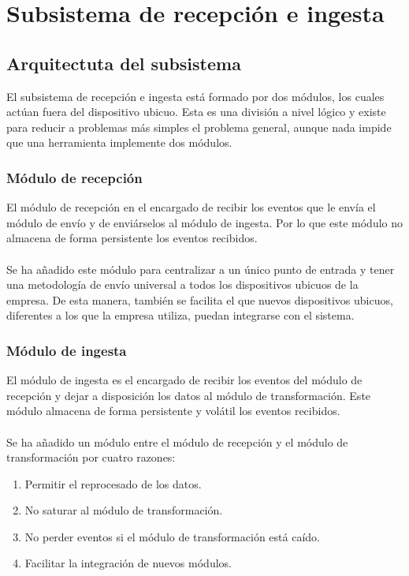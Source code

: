 \chapter{Subsistema de recepción e ingesta}

\section{Arquitectuta del subsistema}

El subsistema de recepción e ingesta está formado por dos módulos, los cuales actúan fuera del dispositivo ubicuo. Esta es una división a nivel lógico y existe para reducir a problemas más simples el problema general, aunque nada impide que una herramienta implemente dos módulos.

\subsection{Módulo de recepción}

El módulo de recepción en el encargado de recibir los eventos que le envía el módulo de envío y de enviárselos al módulo de ingesta. Por lo que este módulo no almacena de forma persistente los eventos recibidos.
\\\\
Se ha añadido este módulo para centralizar a un único punto de entrada y tener una metodología de envío universal a todos los dispositivos ubicuos de la empresa. De esta manera, también se facilita el que nuevos dispositivos ubicuos, diferentes a los que la empresa utiliza, puedan integrarse con el sistema.

\subsection{Módulo de ingesta} 

El módulo de ingesta es el encargado de recibir los eventos del módulo de recepción y dejar a disposición los datos al módulo de transformación. Este módulo almacena de forma persistente y volátil los eventos recibidos.
\\\\
Se ha añadido un módulo entre el módulo de recepción y el módulo de transformación por cuatro razones:

\begin{enumerate}
	\item Permitir el reprocesado de los datos.
	\item No saturar al módulo de transformación.
	\item No perder eventos si el módulo de transformación está caído.
	\item Facilitar la integración de nuevos módulos.
\end{enumerate}

